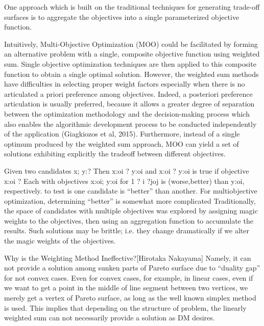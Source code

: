             One approach which is built on the traditional techniques for generating trade-off surfaces is to aggregate the objectives into a single parameterized objective function.

            Intuitively, Multi-Objective Optimization (MOO) could be
            facilitated by forming an alternative problem with a single,
            composite objective function using weighted sum. Single
            objective optimization techniques are then applied to this
            composite function to obtain a single optimal solution.
            However, the weighted sum methods have difficulties in
            selecting proper weight factors especially when there is no
            articulated a priori preference among objectives. Indeed, a
            posteriori preference articulation is usually preferred, because it
            allows a greater degree of separation between the optimization
            methodology and the decision-making process which also
            enables the algorithmic development process to be conducted
            independently of the application (Giagkiozos et al, 2015).
            Furthermore, instead of a single optimum produced by the
            weighted sum approach, MOO can yield a set of solutions
            exhibiting explicitly the tradeoff between different objectives. \cite{DBLP:journals/corr/abs-1812-07958}


            Given two candidates x; y:? Then x:oi ? y:oi and x:oi ? y:oi is true if objective x:oi ? 
            Each with objectives x:oi; y:oi for 1 ? i ?joj is (worse,better) than y:oi, respectively. to test is one candidate is “better” than another. 
            For multiobjective optimization, determining “better” is somewhat more complicated Traditionally, the space of candidates 
            with multiple objectives was explored by assigning magic weights to the objectives, then using an aggregation function to 
            accumulate the results. Such solutions may be brittle; i.e. they change dramatically if we alter the magic weights of the objectives.

            Why is the Weighting Method Ineffective?[Hirotaka Nakayama]
            Namely, it can not provide a solution among sunken parts of Pareto surface due to “duality gap” for not convex cases. 
            Even for convex cases, for example, in linear cases, even if we want to get a point in the middle of line segment between two vertices, we merely get a vertex of Pareto surface, as
            long as the well known simplex method is used. This implies that depending on the structure of problem, the linearly weighted sum can not necessarily provide a solution as DM desires.



